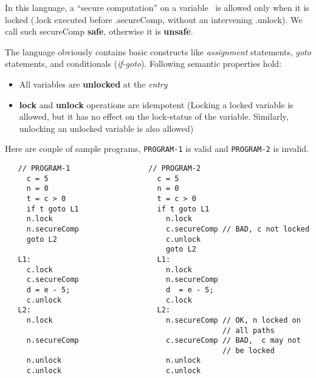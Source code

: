 \documentclass[12pt]{article}
\begin{document}
\begin{enumerate}
  In this language, a ``secure computation'' on a variable \px\
  is allowed only when it is locked (\px.lock executed before
  \px.secureComp, without an intervening \px.unlock). We call
  such secureComp {\bf safe}, otherwise it is {\bf unsafe}.

  The language obviously contains basic constructs like {\em
    assignment} statements, {\em goto} statements, and
  conditionals ({\em if-goto}). Following semantic properties
  hold:
 \begin{itemize}
 \item All variables are {\bf unlocked} at the {\em entry}
 \item  {\bf lock}  and  {\bf unlock}  operations are  idempotent
   (Locking a locked variable is allowed, but it has no effect on
   the  lock-status  of  the  variable.  Similarly,  unlocking  an
   unlocked variable is also allowed)
 \end{itemize}
 Here are couple of sample programs, {\tt PROGRAM-1} is valid and
 {\tt PROGRAM-2} is invalid.
\begin{verbatim}
   // PROGRAM-1                  // PROGRAM-2
     c = 5                         c = 5 
     n = 0                         n = 0
     t = c > 0                     t = c > 0
     if t goto L1                  if t goto L1
     n.lock                          n.lock   
     n.secureComp                    c.secureComp // BAD, c not locked
     goto L2                         c.unlock  
                                     goto L2
   L1:                             L1:
     c.lock                          n.lock
     c.secureComp                    n.secureComp
     d = e - 5;                      d  = e - 5;
     c.unlock                        c.lock
   L2:                             L2:
     n.lock                          n.secureComp // OK, n locked on
                                                  // all paths
     n.secureComp                    c.secureComp // BAD,  c may not
                                                  // be locked 
     n.unlock                        n.unlock
     c.unlock                        c.unlock
\end{verbatim}


\end{enumerate}
\end{document}
